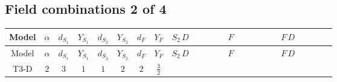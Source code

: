 \documentclass[8pt]{article}
\begin{document}
\begin{landscape}
\subsection*{Field combinations 2 of 4}
\begin{longtable}{@{}cccccccc >{\raggedright\arraybackslash}p{0.21\linewidth} >{\raggedright\arraybackslash}p{0.21\linewidth} >{\raggedright\arraybackslash}p{0.21\linewidth}@{}}
\toprule
Model & $\alpha$ & $d_{S_1}$ & $Y_{S_1}$ & $d_{S_2}$ & $Y_{S_2}$ & $d_F$ & $Y_F$ & $S_2\,D$ & $F$ & $F\,D$ \\
\midrule
\endfirsthead
\toprule
Model & $\alpha$ & $d_{S_1}$ & $Y_{S_1}$ & $d_{S_2}$ & $Y_{S_2}$ & $d_F$ & $Y_F$ & $S_2\,D$ & $F$ & $F\,D$ \\
\midrule
\endhead
T3-D & $2$ & $3$ & $1$ & $1$ & $2$ & $2$ & $\frac{3}{2}$ & \scriptsize\adjustbox{max width=\linewidth}{$\begin{gathered} +D_{\mu _1}\left(S_2\right){}^{\dagger } D_{\mu _1}\left(S_2\right)\end{gathered}$} & \scriptsize\adjustbox{max width=\linewidth}{$\begin{gathered} -\overline{F_{j_1,r_1}}\, F_{j_1,r_1} M_F\end{gathered}$} & \scriptsize\adjustbox{max width=\linewidth}{$\begin{gathered} +i \overline{F_{j_1,r_1}}\, \gamma ^{\mu _1}\, D_{\mu _1}\left(F_{j_1,r_1}\right)\end{gathered}$} \\
\midrule
\bottomrule
\end{longtable}
\clearpage

\end{landscape}
\end{document}
